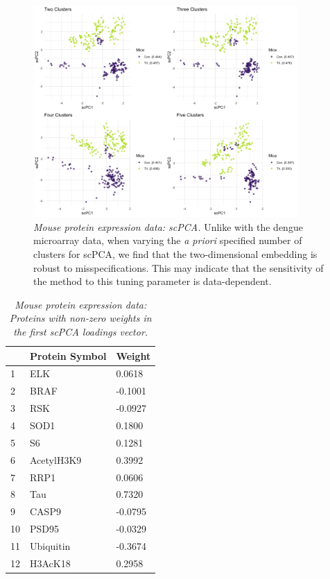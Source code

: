 \documentclass{article}
\begin{document}
\begin{figure}[!htbp]
    \centering
    \includegraphics[width=0.9\textwidth]{figures/mice_scpca_centers}
    \caption{
    \textit{Mouse protein expression data: scPCA.}
    Unlike with the dengue microarray data, when varying the \textit{a priori} specified number of clusters for scPCA, we find that the two-dimensional embedding is robust to misspecifications. This may indicate that the sensitivity of the method to this tuning parameter is data-dependent.
    }
    \label{fig:mice_scpca_centers}
\end{figure}

\begin{longtable}{| l | p{4cm} | l |}
  \caption{{\em Mouse protein expression data: Proteins with non-zero weights in the first scPCA loadings vector.}} \label{tab:mouse_prot_1} \\
  \hline
   & Protein Symbol & Weight \\ 
 \hline
  1 & ELK & 0.0618 \\ 
  2 & BRAF & -0.1001 \\ 
  3 & RSK & -0.0927 \\ 
  4 & SOD1 & 0.1800 \\ 
  5 & S6 & 0.1281 \\ 
  6 & AcetylH3K9 & 0.3992 \\ 
  7 & RRP1 & 0.0606 \\ 
  8 & Tau & 0.7320 \\ 
  9 & CASP9 & -0.0795 \\ 
  10 & PSD95 & -0.0329 \\ 
  11 & Ubiquitin & -0.3674 \\ 
  12 & H3AcK18 & 0.2958 \\ 
 \hline
 \end{longtable}
\end{document}
